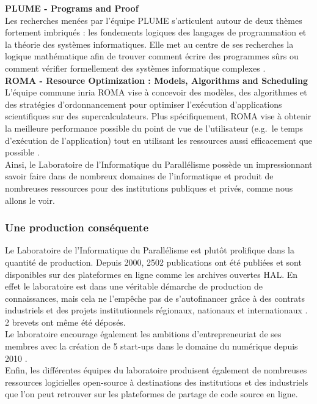 \textbf{PLUME - Programs and Proof}\\
Les recherches menées par l'équipe PLUME s'articulent autour de deux thèmes fortement imbriqués : les fondements logiques des langages de programmation et la théorie des systèmes informatiques. Elle met au centre de ses recherches la logique mathématique afin de trouver comment écrire des programmes sûrs ou comment vérifier formellement des systèmes informatique complexes \cite{plume}.\\

\textbf{ROMA - Resource Optimization : Models, Algorithms and Scheduling}\\
L'équipe commune \gls{inria} ROMA vise à concevoir des modèles, des algorithmes et des stratégies d'ordonnancement pour optimiser l'exécution d'applications scientifiques sur des supercalculateurs. Plus spécifiquement, ROMA vise à obtenir la \og meilleure\fg{} performance possible du point de vue de l'utilisateur (e.g.\ le temps d'exécution de l'application) tout en utilisant les ressources aussi efficacement que possible \cite{roma}.\\

Ainsi, le Laboratoire de l'Informatique du Parallélisme possède un impressionnant savoir faire dans de nombreux domaines de l'informatique et produit de nombreuses ressources pour des institutions publiques et privés, comme nous allons le voir.

\subsubsection{Une production conséquente}
Le Laboratoire de l'Informatique du Parallélisme est plutôt prolifique dans la quantité de production. Depuis 2000, 2502 publications ont été publiées et sont disponibles sur des plateformes en ligne comme les archives ouvertes HAL. En effet le laboratoire est dans une véritable démarche de production de connaissances, mais cela ne l'empêche pas de s'autofinancer grâce à des contrats industriels et des projets institutionnels régionaux, nationaux et internationaux \cite{reportHCERES}. 2 brevets ont même été déposés.\\

Le laboratoire encourage également les ambitions d'entrepreneuriat de ses membres avec la création de 5 start-ups dans le domaine du numérique depuis 2010 \cite{presUCBL}.\\

Enfin, les différentes équipes du laboratoire produisent également de nombreuses ressources logicielles open-source à destinations des institutions et des industriels que l'on peut retrouver sur les plateformes de partage de code source en ligne.